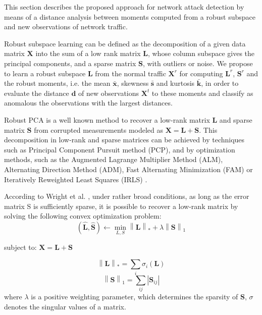 This section describes the proposed approach for network attack detection by means of a distance analysis between moments computed from a robust subspace and new observations of network traffic. 

Robust subspace learning can be defined as the decomposition of a given data matrix $\textbf{X}$ into the sum of a low rank matrix $\textbf{L}$, whose column subspace gives the principal components, and a sparse matrix $\textbf{S}$, with outliers or noise. We propose to learn a robust subspace $\textbf{L}$ from the normal traffic $\textbf{X}^r$ for computing $\textbf{L}^r$, $\textbf{S}^r$ and the robust moments, i.e. the mean $\boldsymbol{\bar{x}}$, skewness $\boldsymbol{\bar{s}}$ and kurtosis $\boldsymbol{\bar{k}}$, in order to evaluate the distance $\boldsymbol{d}$ of new observations $\boldsymbol{X}^t$ to these moments and classify as anomalous the observations with the largest distances.

Robust PCA is a well known method to recover a low-rank matrix $\textbf{L}$ and sparse matrix $\textbf{S}$ from corrupted measurements modeled as $\textbf{X} = \textbf{L} + \textbf{S}$. This decomposition in low-rank and sparse matrices can be achieved by techniques such as Principal Component Pursuit method (PCP), and by optimization methods, such as the Augmented Lagrange Multiplier Method (ALM), Alternating Direction Method (ADM), Fast Alternating Minimization (FAM) or Iteratively Reweighted Least Squares (IRLS) \cite{candes2011robust,vaswani2018robust,lerman2018overview}.

According to Wright et al. \cite{wright2009robust}, under rather broad conditions, as long as the error matrix S is sufficiently sparse, it is possible to recover a low-rank matrix by solving the following convex optimization problem:
\begin{equation}\label{eq:4.01}
	(\boldsymbol{\hat{L}}, \boldsymbol{\hat{S}})\leftarrow \min_{L,S}\left \| \boldsymbol{L} \right \|_{*} + \lambda \left \| \boldsymbol{S} \right \|_{1}
\end{equation}
\begin{center} subject to: $\boldsymbol{X} = \boldsymbol{L} + \boldsymbol{S}$ \end{center}
\begin{equation}\label{eq:4.02}
    \left \| \boldsymbol{L} \right \|_{*} = \sum_{i} \sigma_{i}(\boldsymbol{L})
\end{equation}
\begin{equation}\label{eq:4.03}
    \left \| \boldsymbol{S} \right \|_{1} = \sum_{ij} \left | \boldsymbol{S}_{ij} \right |
\end{equation}
where $\lambda$ is a positive weighting parameter, which determines the sparsity of $\boldsymbol{S}$, $\sigma$ denotes the singular values of a matrix. 

